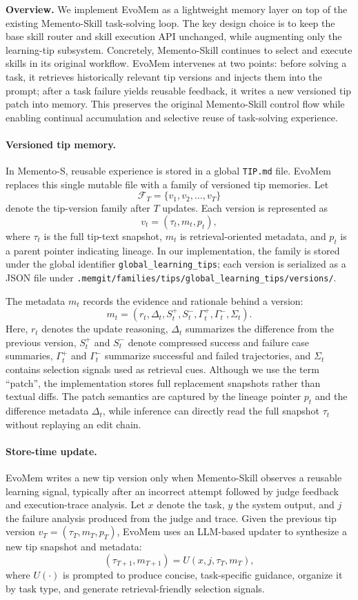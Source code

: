 \documentclass{llmxive}
\begin{document}
\textbf{Overview.}
We implement EvoMem as a lightweight memory layer on top of the existing Memento-Skill task-solving loop. The key design choice is to keep the base skill router and skill execution API unchanged, while augmenting only the learning-tip subsystem. Concretely, Memento-Skill continues to select and execute skills in its original workflow. EvoMem intervenes at two points: before solving a task, it retrieves historically relevant tip versions and injects them into the prompt; after a task failure yields reusable feedback, it writes a new versioned tip patch into memory. This preserves the original Memento-Skill control flow while enabling continual accumulation and selective reuse of task-solving experience.

\paragraph{Versioned tip memory.}
In Memento-S, reusable experience is stored in a global \texttt{TIP.md} file. EvoMem replaces this single mutable file with a family of versioned tip memories. Let
\[
\mathcal{F}_T=\{v_1,v_2,\ldots,v_T\}
\]
denote the tip-version family after $T$ updates. Each version is represented as
\[
v_t=(\tau_t,m_t,p_t),
\]
where $\tau_t$ is the full tip-text snapshot, $m_t$ is retrieval-oriented metadata, and $p_t$ is a parent pointer indicating lineage. In our implementation, the family is stored under the global identifier \texttt{global\_learning\_tips}; each version is serialized as a JSON file under \texttt{.memgit/families/tips/global\_learning\_tips/versions/}.

The metadata $m_t$ records the evidence and rationale behind a version:
\[
m_t =
\left(
r_t,\Delta_t,S_t^{+},S_t^{-},\Gamma_t^{+},\Gamma_t^{-},\Sigma_t
\right).
\]
Here, $r_t$ denotes the update reasoning, $\Delta_t$ summarizes the difference from the previous version, $S_t^{+}$ and $S_t^{-}$ denote compressed success and failure case summaries, $\Gamma_t^{+}$ and $\Gamma_t^{-}$ summarize successful and failed trajectories, and $\Sigma_t$ contains selection signals used as retrieval cues. Although we use the term ``patch'', the implementation stores full replacement snapshots rather than textual diffs. The patch semantics are captured by the lineage pointer $p_t$ and the difference metadata $\Delta_t$, while inference can directly read the full snapshot $\tau_t$ without replaying an edit chain.

\paragraph{Store-time update.}
EvoMem writes a new tip version only when Memento-Skill observes a reusable learning signal, typically after an incorrect attempt followed by judge feedback and execution-trace analysis. Let $x$ denote the task, $y$ the system output, and $j$ the failure analysis produced from the judge and trace. Given the previous tip version $v_T=(\tau_T,m_T,p_T)$, EvoMem uses an LLM-based updater to synthesize a new tip snapshot and metadata:
\[
(\tau_{T+1},m_{T+1}) = U(x,j,\tau_T,m_T),
\]
where $U(\cdot)$ is prompted to produce concise, task-specific guidance, organize it by task type, and generate retrieval-friendly selection signals.
\end{document}
